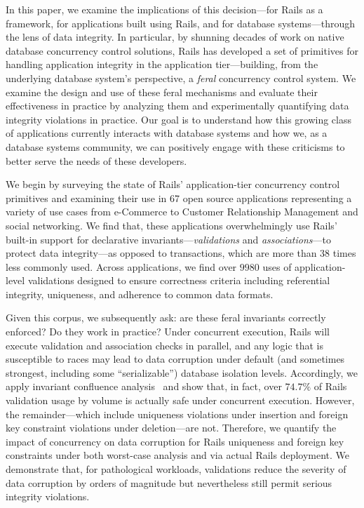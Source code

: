 In this paper, we examine the implications of this decision---for
Rails as a framework, for applications built using Rails, and for
database systems---through the lens of data integrity. In particular,
by shunning decades of work on native database concurrency control
solutions, Rails has developed a set of primitives for handling
application integrity in the application tier---building, from the
underlying database system's perspective, a \textit{feral} concurrency
control system. We examine the design and use of these feral
mechanisms and evaluate their effectiveness in practice by analyzing
them and experimentally quantifying data integrity violations in
practice. Our goal is to understand how this growing class of
applications currently interacts with database systems and how we, as
a database systems community, we can positively engage with these
criticisms to better serve the needs of these developers.

We begin by surveying the state of Rails' application-tier concurrency
control primitives and examining their use in 67 open source
applications representing a variety of use cases from e-Commerce to
Customer Relationship Management and social networking. We find that,
these applications overwhelmingly use Rails' built-in support for
declarative invariants---\textit{validations} and
\textit{associations}---to protect data integrity---as opposed to
transactions, which are more than 38 times less commonly used. Across
applications, we find over $9980$ uses of application-level
validations designed to ensure correctness criteria including
referential integrity, uniqueness, and adherence to common data
formats.

Given this corpus, we subsequently ask: are these feral invariants
correctly enforced? Do they work in practice? Under concurrent
execution, Rails will execute validation and association checks in
parallel, and any logic that is susceptible to races may lead to data
corruption under default (and sometimes strongest, including some
``serializable'') database isolation levels. Accordingly, we apply
invariant confluence analysis~\cite{coord-avoid} and show that, in
fact, over $74.7\%$ of Rails validation usage by volume is actually
safe under concurrent execution. However, the remainder---which include
uniqueness violations under insertion and foreign key constraint
violations under deletion---are not. Therefore, we quantify the impact
of concurrency on data corruption for Rails uniqueness and foreign key
constraints under both worst-case analysis and via actual Rails
deployment. We demonstrate that, for pathological workloads,
validations reduce the severity of data corruption by orders of
magnitude but nevertheless still permit serious integrity
violations.

